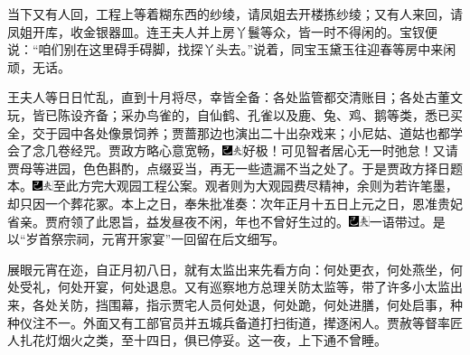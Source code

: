 当下又有人回，工程上等着糊东西的纱绫，请凤姐去开楼拣纱绫；又有人来回，请凤姐开库，收金银器皿。连王夫人并上房丫鬟等众，皆一时不得闲的。宝钗便说：``咱们别在这里碍手碍脚，找探丫头去。''说着，同宝玉黛玉往迎春等房中来闲顽，无话。

王夫人等日日忙乱，直到十月将尽，幸皆全备：各处监管都交清账目；各处古董文玩，皆已陈设齐备；采办鸟雀的，自仙鹤、孔雀以及鹿、兔、鸡、鹅等类，悉已买全，交于园中各处像景饲养；贾蔷那边也演出二十出杂戏来；小尼姑、道姑也都学会了念几卷经咒。贾政方略心意宽畅，{\includegraphics[width=3mm]{../Images/00003}\includegraphics[width=3mm]{../Images/00012}\footnotesize \kaishu 好极！可见智者居心无一时弛怠！}又请贾母等进园，色色斟酌，点缀妥当，再无一些遗漏不当之处了。于是贾政方择日题本。{\includegraphics[width=3mm]{../Images/00003}\includegraphics[width=3mm]{../Images/00012}\footnotesize \kaishu 至此方完大观园工程公案。观者则为大观园费尽精神，余则为若许笔墨，却只因一个葬花冢。}本上之日，奉朱批准奏：次年正月十五日上元之日，恩准贵妃省亲。贾府领了此恩旨，益发昼夜不闲，年也不曾好生过的。{\includegraphics[width=3mm]{../Images/00003}\includegraphics[width=3mm]{../Images/00012}\footnotesize \kaishu 一语带过。是以``岁首祭宗祠，元宵开家宴''一回留在后文细写。}

展眼元宵在迩，自正月初八日，就有太监出来先看方向：何处更衣，何处燕坐，何处受礼，何处开宴，何处退息。又有巡察地方总理关防太监等，带了许多小太监出来，各处关防，挡围幕，指示贾宅人员何处退，何处跪，何处进膳，何处启事，种种仪注不一。外面又有工部官员并五城兵备道打扫街道，撵逐闲人。贾赦等督率匠人扎花灯烟火之类，至十四日，俱已停妥。这一夜，上下通不曾睡。

